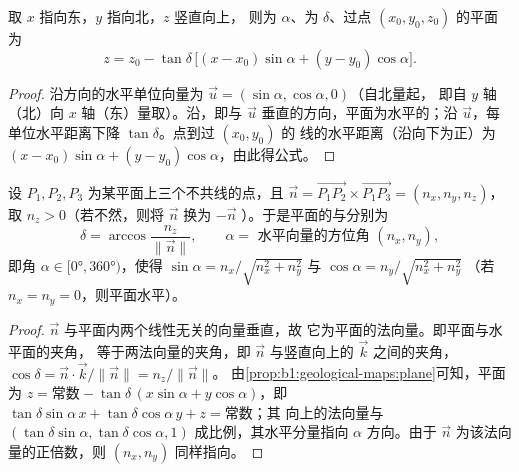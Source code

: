 \begin{proposition}[倾斜平面的方程]\label{prop:b1:geological-maps:plane}
取 $x$ 指向东，$y$ 指向北，$z$ 竖直向上，
则为 $\alpha$、为 $\delta$、过点 $(x_0, y_0, z_0)$ 的平面为
\[
  z = z_0 - \tan\delta\,\bigl[(x - x_0)\sin\alpha + (y - y_0)\cos\alpha\bigr].
\]
\end{proposition}

\begin{proof}
沿方向的水平单位向量为
$\vec u = (\sin\alpha, \cos\alpha, 0)$（自北量起，
即自 $y$ 轴（北）向 $x$ 轴（东）量取）。沿，即与
$\vec u$ 垂直的方向，平面为水平的；沿 $\vec u$，每
单位水平距离下降 $\tan\delta$。点到过 $(x_0, y_0)$ 的
线的水平距离（沿向下为正）为
$(x-x_0)\sin\alpha + (y-y_0)\cos\alpha$，由此得公式。
\end{proof}

\begin{theorem}[由三点确定产状]\label{thm:b1:geological-maps:three-point}
设 $P_1, P_2, P_3$ 为某平面上三个不共线的点，且
$\vec n = \overrightarrow{P_1P_2} \times \overrightarrow{P_1P_3} =
(n_x, n_y, n_z)$，取 $n_z > 0$（若不然，则将 $\vec n$ 换为 $-\vec n$
）。于是平面的与分别为
\[
  \delta = \arccos\frac{n_z}{\|\vec n\|}, \qquad
  \alpha = \text{ 水平向量的方位角 } (n_x, n_y),
\]
即角 $\alpha \in [\ang{0}, \ang{360})$，使得
$\sin\alpha = n_x/\sqrt{n_x^2+n_y^2}$ 与 $\cos\alpha = n_y/\sqrt{n_x^2+n_y^2}$
（若 $n_x = n_y = 0$，则平面水平）。
\end{theorem}

\begin{proof}
$\vec n$ 与平面内两个线性无关的向量垂直，故
它为平面的法向量。即平面与水平面的夹角，
等于两法向量的夹角，即 $\vec n$ 与竖直向上的
$\vec k$ 之间的夹角，$\cos\delta = \vec n \cdot \vec k / \|\vec n\| = n_z/\|\vec n\|$。
由\cref{prop:b1:geological-maps:plane}可知，平面为 $z = \text{常数} -
\tan\delta\,(x\sin\alpha + y\cos\alpha)$，即
$\tan\delta\sin\alpha\,x + \tan\delta\cos\alpha\,y + z = \text{常数}$；其
向上的法向量与 $(\tan\delta\sin\alpha,
\tan\delta\cos\alpha, 1)$ 成比例，其水平分量指向
 $\alpha$ 方向。由于 $\vec n$ 为该法向量的正倍数，则 $(n_x, n_y)$
同样指向。
\end{proof}

